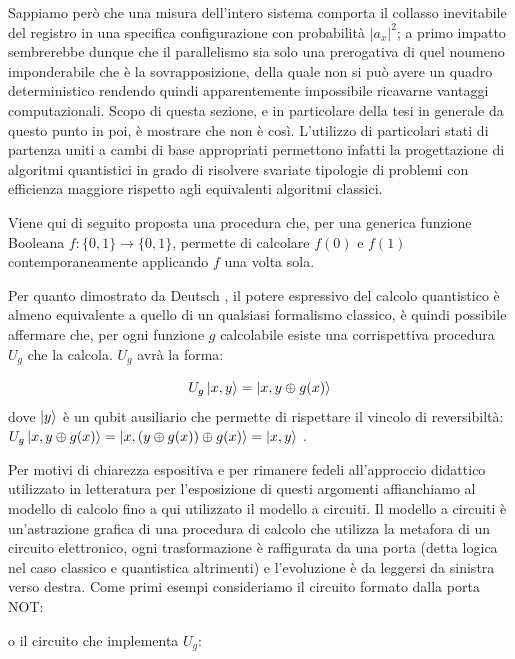 \documentclass[12pt,a4paper,openright]{report}
\newcommand*\xor{\mathbin{\oplus}}
\begin{document}
Sappiamo però che una misura dell'intero sistema comporta il collasso inevitabile del registro in una specifica configurazione con probabilità ${\left\vert{a_x}\right\vert}^2$; a primo impatto sembrerebbe dunque che il parallelismo
sia solo una prerogativa di quel noumeno imponderabile che è la sovrapposizione, della quale non si può avere un quadro deterministico rendendo quindi apparentemente impossibile ricavarne vantaggi computazionali.
Scopo di questa sezione, e in particolare della tesi in generale da questo punto in poi, è mostrare che non è così. L'utilizzo di particolari stati di partenza uniti a cambi di base appropriati permettono infatti
la progettazione di algoritmi quantistici in grado di risolvere svariate tipologie di problemi con efficienza maggiore rispetto agli equivalenti algoritmi classici.\par
Viene qui di seguito proposta una procedura che, per una generica funzione Booleana $f:\{0,1\} \rightarrow \{0,1\}$, permette di calcolare $f(0)$ e $f(1)$ contemporaneamente applicando $f$ una volta sola.\par
Per quanto dimostrato da Deutsch \cite{ref12}, il potere espressivo del calcolo quantistico è almeno equivalente a quello di un qualsiasi formalismo classico, è quindi possibile affermare che, per ogni funzione
$g$ calcolabile esiste una corrispettiva procedura $U_g$ che la calcola. $U_g$ avrà la forma:

\[
    U_g\ket{x,y} = \ket{x, y\xor g(x)}
\]
dove $\ket{y}$ è un qubit ausiliario che permette di rispettare il vincolo di reversibiltà: $U_g\ket{x, y \xor g(x)} = \ket{x, (y\xor g(x)) \xor g(x)} = \ket{x, y}$ .

Per motivi di chiarezza espositiva e per rimanere fedeli all'approccio didattico utilizzato in letteratura per l'esposizione di questi argomenti affianchiamo al modello di calcolo fino a qui utilizzato il modello
a circuiti. Il modello a circuiti è un'astrazione grafica di una procedura di calcolo che utilizza la metafora di un circuito elettronico, ogni trasformazione è raffigurata da una porta 
(detta logica nel caso classico e quantistica altrimenti) e l'evoluzione è da leggersi da sinistra verso destra. Come primi esempi consideriamo il circuito formato dalla porta NOT:

\begin{figure}[h] 
    \centering
\end{figure}
o il circuito che implementa $U_g$:
\end{document}
